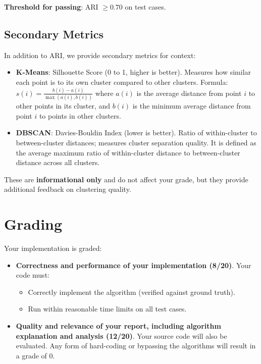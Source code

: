 \documentclass[]{article}
\begin{document}
	\textbf{Threshold for passing}: ARI $\geq 0.70$ on test cases.
	
	\subsection{Secondary Metrics}
	
	In addition to ARI, we provide secondary metrics for context:
	
	\begin{itemize}
		\item \textbf{K-Means}: Silhouette Score (0 to 1, higher is better). Measures how similar each point is to its own cluster compared to other clusters. Formula: $s(i) = \frac{b(i) - a(i)}{\max(a(i), b(i))}$ where $a(i)$ is the average distance from point $i$ to other points in its cluster, and $b(i)$ is the minimum average distance from point $i$ to points in other clusters.
		\item \textbf{DBSCAN}: Davies-Bouldin Index (lower is better). Ratio of within-cluster to between-cluster distances; measures cluster separation quality. It is defined as the average maximum ratio of within-cluster distance to between-cluster distance across all clusters.
	\end{itemize}
	
	These are \textbf{informational only} and do not affect your grade, but they provide additional feedback on clustering quality.
	
	\section{Grading}
	
	Your implementation is graded:
	
	\begin{itemize}
		\item \textbf{Correctness and performance of your implementation (8/20)}. Your code must:
		\begin{itemize}
			\item Correctly implement the algorithm (verified against ground truth).
			\item Run within reasonable time limits on all test cases.
		\end{itemize}
		\item \textbf{Quality and relevance of your report, including algorithm explanation and analysis (12/20)}. Your source code will also be evaluated. Any form of hard-coding or bypassing the algorithms will result in a grade of 0.
	\end{itemize}
	
\end{document}
